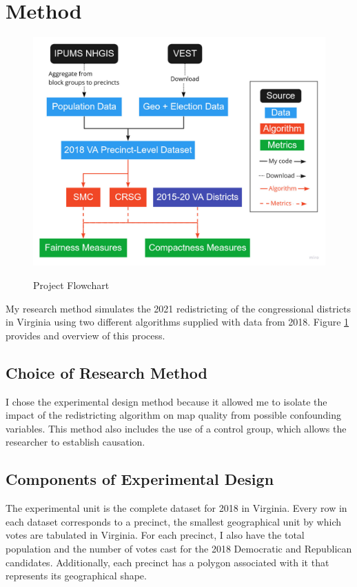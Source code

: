 \section{Method}
\label{sec:method}

\begin{figure}[H]
    \caption{Project Flowchart}
    \includegraphics[width=0.85\linewidth]{img/flowchart.pdf}
    \label{fig:flowchart}
    \raggedright
\end{figure}  

My research method simulates the 2021 redistricting of the congressional districts in Virginia using two different algorithms supplied with data from 2018. Figure \ref{fig:flowchart} provides and overview of this process.

\subsection{Choice of Research Method}

I chose the experimental design method because it allowed me to isolate the impact of the redistricting algorithm on map quality from possible confounding variables. This method also includes the use of a control group, which allows the researcher to establish causation. 

\subsection{Components of Experimental Design}

The experimental unit is the complete dataset for 2018 in Virginia. Every row in each dataset corresponds to a precinct, the smallest geographical unit by which votes are tabulated in Virginia. For each precinct, I also have the total population and the number of votes cast for the 2018 Democratic and Republican candidates. Additionally, each precinct has a polygon associated with it that represents its geographical shape.

